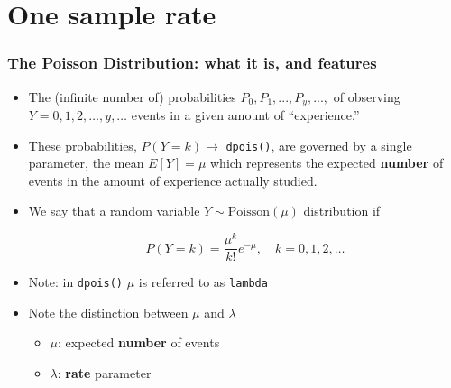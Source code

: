 \documentclass{beamer}\usepackage[]{graphicx}\usepackage[]{color}
\begin{document}
\section{One sample rate}

\begin{frame}
\frametitle{The Poisson Distribution: what it is, and features}

\begin{itemize}
	\small
	\setlength\itemsep{1em}
	\item The (infinite number of) probabilities $P_{0}, P_{1}, ..., P_{y}, ..., $ of observing 
	$Y = 0, 1, 2, \dots , y, \dots $ events in a given amount of ``experience.''
	
	\item These probabilities, $P(Y = k) \to$ \texttt{dpois()}, are governed by a single parameter, the mean $E[Y] = \mu$ which represents the expected \textbf{number} of events in the amount of experience actually studied.
	
	\item We say that a random variable $Y \sim \textrm{Poisson}(\mu)$ distribution if 
	
	\[ P(Y=k) = \frac{\mu^k}{k!}e^{-\mu}, \quad k = 0, 1, 2, \ldots\]
	\pause 
	
	\item Note: in \texttt{dpois()} $\mu$ is referred to as \texttt{lambda}
	
	\item Note the distinction between $\mu$ and $\lambda$
	\begin{itemize}
		\item $\mu$: expected \textbf{number} of events
		\item $\lambda$: \textbf{rate} parameter
	\end{itemize}
\end{itemize}
\end{frame}
\end{document}
